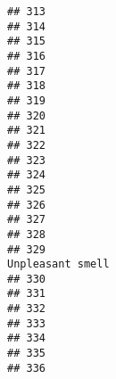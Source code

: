 \documentclass[
]{article}
\begin{document}
\begin{verbatim}
## 313                                                                                                        
## 314                                                                                                        
## 315                                                                                                        
## 316                                                                                                        
## 317                                                                                                        
## 318                                                                                                        
## 319                                                                                                        
## 320                                                                                                        
## 321                                                                                                        
## 322                                                                                                        
## 323                                                                                                        
## 324                                                                                                        
## 325                                                                                                        
## 326                                                                                                        
## 327                                                                                                        
## 328                                                                                                        
## 329                                                                                        Unpleasant smell
## 330                                                                                                        
## 331                                                                                                        
## 332                                                                                                        
## 333                                                                                                        
## 334                                                                                                        
## 335                                                                                                        
## 336                                                                                                        

\end{verbatim}
\end{document}
